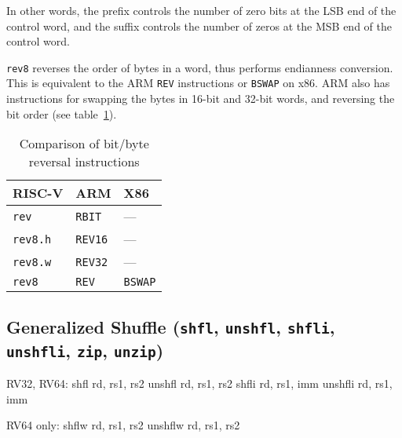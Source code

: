 In other words, the prefix controls the number of zero bits at the LSB end of the
control word, and the suffix controls the number of zeros at the MSB end of the control
word.

{\tt rev8} reverses the order of bytes in a word, thus performs endianness conversion. This
is equivalent to the ARM {\tt REV} instructions or {\tt BSWAP} on x86. ARM also has instructions
for swapping the bytes in 16-bit and 32-bit words, and reversing the bit order (see table~\ref{grevi-cmp}).

\begin{table}[h]
\begin{center}
\begin{tabular}{l|l|l}
RISC-V & ARM & X86 \\
\hline
{\tt rev}    & {\tt RBIT}  & --- \\
{\tt rev8.h} & {\tt REV16} & --- \\
{\tt rev8.w} & {\tt REV32} & --- \\
{\tt rev8}   & {\tt REV}   & {\tt BSWAP} \\
\end{tabular}
\end{center}
\caption{Comparison of bit/byte reversal instructions}
\label{grevi-cmp}
\end{table}

%
%
%


\subsection{Generalized Shuffle (\texttt{shfl}, \texttt{unshfl}, \texttt{shfli}, \texttt{unshfli}, \texttt{zip}, \texttt{unzip})}
\label{gzip}

\begin{rvb}
  RV32, RV64:
    shfl    rd, rs1, rs2
    unshfl  rd, rs1, rs2
    shfli   rd, rs1, imm
    unshfli rd, rs1, imm

  RV64 only:
    shflw    rd, rs1, rs2
    unshflw  rd, rs1, rs2
\end{rvb}

